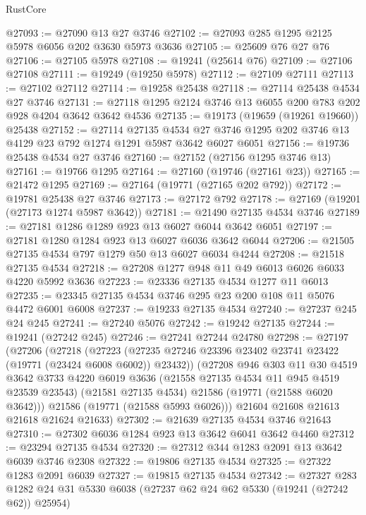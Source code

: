 \begin{lexlean}{RustCore}
\begin{coremodule}
@27093 := @27090 @13 @27 @3746
@27102 := @27093 @285 @1295 @2125 @5978 @6056 @202 @3630 @5973 @3636
@27105 := @25609 @76 @27 @76
@27106 := @27105 @5978
@27108 := @19241 (@25614 @76)
@27109 := @27106 @27108
@27111 := @19249 (@19250 @5978)
@27112 := @27109 @27111
@27113 := @27102 @27112
@27114 := @19258 @25438
@27118 := @27114 @25438 @4534 @27 @3746
@27131 := @27118 @1295 @2124 @3746 @13 @6055 @200 @783 @202 @928 @4204 @3642 @3642 @4536
@27135 := @19173 (@19659 (@19261 @19660)) @25438
@27152 := @27114
    @27135
    @4534
    @27
    @3746
    @1295
    @202
    @3746
    @13
    @4129
    @23
    @792
    @1274
    @1291
    @5987
    @3642
    @6027
    @6051
@27156 := @19736 @25438 @4534 @27 @3746
@27160 := @27152 (@27156 @1295 @3746 @13)
@27161 := @19766 @1295
@27164 := @27160 (@19746 (@27161 @23))
@27165 := @21472 @1295
@27169 := @27164 (@19771 (@27165 @202 @792))
@27172 := @19781 @25438 @27 @3746
@27173 := @27172 @792
@27178 := @27169 (@19201 (@27173 @1274 @5987 @3642))
@27181 := @21490 @27135 @4534 @3746
@27189 := @27181 @1286 @1289 @923 @13 @6027 @6044 @3642 @6051
@27197 := @27181 @1280 @1284 @923 @13 @6027 @6036 @3642 @6044
@27206 := @21505 @27135 @4534 @797 @1279 @50 @13 @6027 @6034 @4244
@27208 := @21518 @27135 @4534
@27218 := @27208 @1277 @948 @11 @49 @6013 @6026 @6033 @4220 @5992 @3636
@27223 := @23336 @27135 @4534 @1277 @11 @6013
@27235 := @23345 @27135 @4534 @3746 @295 @23 @200 @108 @11 @5076 @4472 @6001 @6008
@27237 := @19233 @27135 @4534
@27240 := @27237 @245 @24 @245
@27241 := @27240 @5076
@27242 := @19242 @27135
@27244 := @19241 (@27242 @245)
@27246 := @27241 @27244 @24780
@27298 := @27197
    (@27206
      (@27218
        (@27223 (@27235 @27246 @23396 @23402 @23741 @23422 (@19771 (@23424 @6008 @6002)) @23432))
        (@27208
          @946
          @303
          @11
          @30
          @4519
          @3642
          @3733
          @4220
          @6019
          @3636
          (@21558 @27135 @4534 @11 @945 @4519 @23539 @23543)
          (@21581 @27135 @4534)
          @21586
          (@19771 (@21588 @6020 @3642)))
        @21586
        (@19771 (@21588 @5993 @6026)))
      @21604
      @21608
      @21613
      @21618
      @21624
      @21633)
@27302 := @21639 @27135 @4534 @3746 @21643
@27310 := @27302 @6036 @1284 @923 @13 @3642 @6041 @3642 @4460
@27312 := @23294 @27135 @4534
@27320 := @27312 @344 @1283 @2091 @13 @3642 @6039 @3746 @2308
@27322 := @19806 @27135 @4534
@27325 := @27322 @1283 @2091 @6039
@27327 := @19815 @27135 @4534
@27342 := @27327
    @283
    @1282
    @24
    @31
    @5330
    @6038
    (@27237 @62 @24 @62 @5330 (@19241 (@27242 @62)) @25954)

\end{coremodule}
\end{lexlean}
